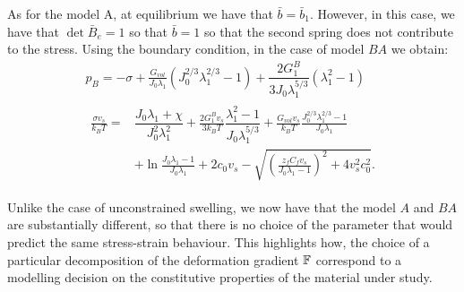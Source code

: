 As for the model A, at equilibrium we have that $\bar{b}=\bar{b}_1$. However, in this case, we have that $\det \bar{B}_e=1$ so that $\bar{b}=1$ so that the second spring does not contribute to the stress. Using the boundary condition, in the case of model $BA$ we obtain:
\begin{gather}
\displaystyle 
p_{B} = -\sigma + \frac{G_{vol}}{J_0\lambda_1}(J_0^{2/3}\lambda_1^{2/3}-1)+\dfrac{2G^B_1}{3J_0\lambda_1^{5/3}} (\lambda_1^2-1) \\
\begin{aligned}
\frac{\sigma v_s}{k_B T}=&\dfrac{J_0\lambda_1+\chi}{J_0^2\lambda^2_1}+\frac{2G_1^Bv_s}{3k_BT} \dfrac{\lambda^2_1-1}{J_0 \lambda_1^{5/3}}+\frac{G_{vol}v_s}{k_BT}\frac{J_0^{2/3}\lambda_1^{2/3}-1}{J_0\lambda_1}\\[1.5mm]
& +\ln \frac{J_0\lambda_1-1}{J_0\lambda_1}+2c_0v_s-\sqrt{\left(\frac{z_fC_fv_s}{J_0\lambda_1-1}\right)^2+4v_s^2c^2_0}.\label{compAB}
\end{aligned}
\end{gather}

Unlike the case of unconstrained swelling, we now have that the model $A$ and $BA$ are substantially different, so that there is no choice of the parameter that would predict the same stress-strain behaviour. This highlights how, the choice of a particular decomposition of the deformation gradient $\mathbb{F}$ correspond to a modelling decision on the constitutive properties of the material under study.  

